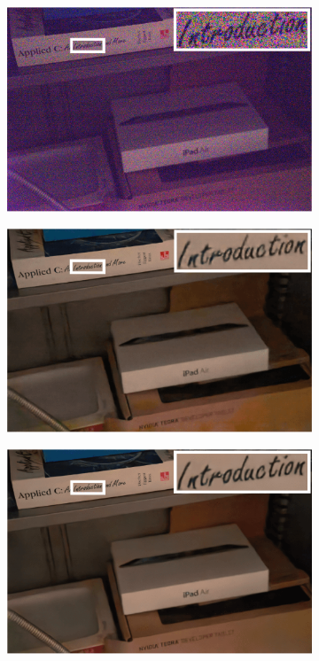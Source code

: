 \documentclass[letterpaper,12pt]{article}
\begin{document}
		\begin{figure}[htbp] 
			\centering 
			\begin{subfigure}{0.3\textwidth}
				\includegraphics[width=\linewidth]{qualitative_comparison/a}
				\captionsetup{font=scriptsize}
				\label{fig: qualitative_comparison_a}
			\end{subfigure}
			\begin{subfigure}{0.3\textwidth}
				\includegraphics[width=\linewidth]{qualitative_comparison/b}
				\captionsetup{font=scriptsize}
				\label{fig: qualitative_comparison_b}
			\end{subfigure}
			\begin{subfigure}{0.3\textwidth}
				\includegraphics[width=\linewidth]{qualitative_comparison/c}

\end{subfigure}
\end{figure}
\end{document}
